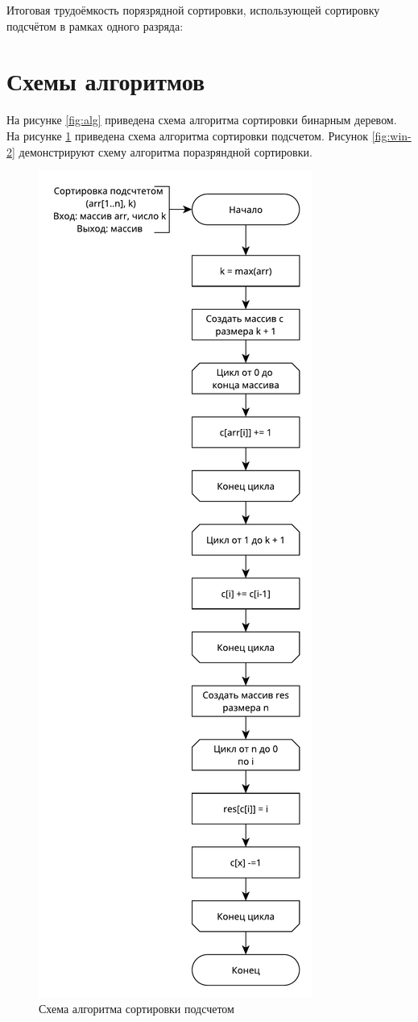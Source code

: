 Итоговая трудоёмкость порязрядной сортировки, использующей сортировку подсчётом в рамках одного разряда: %

\section{Схемы алгоритмов}
На рисунке \ref{fig:alg} приведена схема алгоритма сортировки бинарным деревом. На рисунке \ref{fig:win-1} приведена схема алгоритма сортировки подсчетом. Рисунок  
\ref{fig:win-2} демонстрируют схему алгоритма поразряндной сортировки.\newpage

\begin{figure}[ht!]
	\centering
	\includegraphics[width=0.45\linewidth]{assets/count.pdf}
	\caption{Схема алгоритма сортировки подсчетом}
	\label{fig:win-1}
\end{figure}

